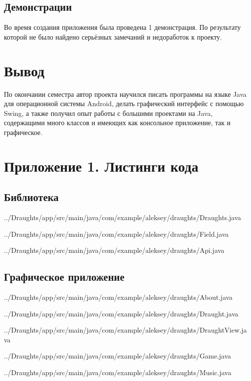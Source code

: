 \documentclass[a4paper]{article}
\begin{document}
\subsection{Демонстрации}
Во время создания приложения была проведена 1 демонстрация. По результату которой не было найдено серьёзных замечаний и недоработок к проекту.

\section{Вывод}
По окончании семестра автор проекта научился писать программы на языке Java для операционной системы Android, делать графический интерфейс с помощью Swing, а также получил опыт работы с большими проектами на Java, содержащими много классов и имеющих как консольное приложение, так и графическое.

\section{Приложение 1. Листинги кода}
\subsection{Библиотека}


{../Draughts/app/src/main/java/com/example/aleksey/draughts/Draughts.java}
\newpage


{../Draughts/app/src/main/java/com/example/aleksey/draughts/Field.java}
\newpage


{../Draughts/app/src/main/java/com/example/aleksey/draughts/Api.java}
\newpage

\subsection{Графическое приложение}


{../Draughts/app/src/main/java/com/example/aleksey/draughts/About.java}
\newpage


{../Draughts/app/src/main/java/com/example/aleksey/draughts/Draught.java}
\newpage


{../Draughts/app/src/main/java/com/example/aleksey/draughts/DraughtView.java}
\newpage


{../Draughts/app/src/main/java/com/example/aleksey/draughts/Game.java}
\newpage


{../Draughts/app/src/main/java/com/example/aleksey/draughts/Music.java}
\newpage
\end{document}
